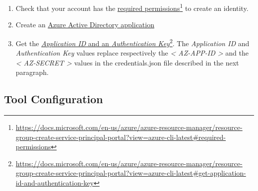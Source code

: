 \begin{enumerate}
\def\labelenumi{\arabic{enumi})}
\item
Check that your account has the
\href{https://docs.microsoft.com/en-us/azure/azure-resource-manager/resource-group-create-service-principal-portal?view=azure-cli-latest\#required-permissions}{required permissions}\footnote{\url{https://docs.microsoft.com/en-us/azure/azure-resource-manager/resource-group-create-service-principal-portal?view=azure-cli-latest\#required-permissions}} to create an identity.
\item
Create an
\href{https://docs.microsoft.com/en-us/azure/azure-resource-manager/resource-group-create-service-principal-portal?view=azure-cli-latest\#create-an-azure-active-directory-application}{Azure
	Active Directory application}
\item
Get the
\href{https://docs.microsoft.com/en-us/azure/azure-resource-manager/resource-group-create-service-principal-portal?view=azure-cli-latest\#get-application-id-and-authentication-key}{\emph{Application ID} and an \emph{Authentication Key}}\footnote{\url{https://docs.microsoft.com/en-us/azure/azure-resource-manager/resource-group-create-service-principal-portal?view=azure-cli-latest\#get-application-id-and-authentication-key}}. The \emph{Application ID} and
\emph{Authentication Key} values replace respectively the
\emph{\textless{} AZ-APP-ID \textgreater{}} and the \emph{\textless{}
	AZ-SECRET \textgreater{}} values in the credentials.json file
described in the next paragraph.
\end{enumerate}

\hypertarget{tool-configuration}{%
\subsection{Tool Configuration}\label{tool-configuration}}

